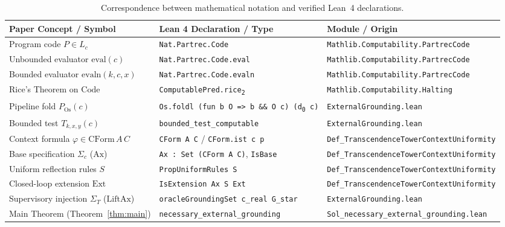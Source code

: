 \documentclass[11pt]{article}
\theoremstyle{plain}
\theoremstyle{definition}
\theoremstyle{remark}
\newcommand{\Code}{\mathrm{Code}}
\newcommand{\eval}{\mathrm{eval}}
\newcommand{\evaln}{\mathrm{evaln}}
\newcommand{\Os}{\mathrm{Os}}
\newcommand{\Ax}{\mathrm{Ax}}
\newcommand{\Ext}{\mathrm{Ext}}
\newcommand{\LiftAx}{\mathrm{LiftAx}}
\newcommand{\CForm}{\mathrm{CForm}}
\begin{document}
\begin{table}[htbp]
\centering
\footnotesize
\renewcommand{\arraystretch}{1.25}
\begin{tabular}{@{}p{}p{}p{}@{}}
\toprule
\textbf{Paper Concept / Symbol} & \textbf{Lean 4 Declaration / Type} & \textbf{Module / Origin} \\
\midrule
Program code $P \in L_c$ & \texttt{Nat.Partrec.Code} & \texttt{Mathlib.Computability.\allowbreak PartrecCode} \\
Unbounded evaluator $\eval(c)$ & \texttt{Nat.Partrec.Code.eval} & \texttt{Mathlib.Computability.\allowbreak PartrecCode} \\
Bounded evaluator $\evaln(k,c,x)$ & \texttt{Nat.Partrec.Code.evaln} & \texttt{Mathlib.Computability.\allowbreak PartrecCode} \\
Rice's Theorem on $\Code$ & \texttt{ComputablePred.rice\textsubscript{2}} & \texttt{Mathlib.Computability.\allowbreak Halting} \\
Pipeline fold $P_{\Os}(c)$ & \texttt{Os.foldl (fun b O => b \&\& O c) (d\textsubscript{0} c)} & \texttt{ExternalGrounding.lean} \\
Bounded test $T_{k,x,y}(c)$ & \texttt{bounded\_test\_computable} & \texttt{ExternalGrounding.lean} \\
Context formula $\varphi \in \CForm\,A\,C$ & \texttt{CForm A C} / \texttt{CForm.ist c p} & \texttt{Def\_TranscendenceTower\allowbreak ContextUniformity} \\
Base specification $\Sigma_c$ ($\Ax$) & \texttt{Ax : Set (CForm A C)}, \texttt{IsBase} & \texttt{Def\_TranscendenceTower\allowbreak ContextUniformity} \\
Uniform reflection rules $S$ & \texttt{PropUniformRules S} & \texttt{Def\_TranscendenceTower\allowbreak ContextUniformity} \\
Closed-loop extension $\Ext$ & \texttt{IsExtension Ax S Ext} & \texttt{Def\_TranscendenceTower\allowbreak ContextUniformity} \\
Supervisory injection $\Sigma_T$ ($\LiftAx$) & \texttt{oracleGroundingSet c\_real G\_star} & \texttt{ExternalGrounding.lean} \\
Main Theorem (Theorem~\ref{thm:main}) & \texttt{necessary\_external\_grounding} & \texttt{Sol\_necessary\_external\_\allowbreak grounding.lean} \\
\bottomrule
\end{tabular}
\caption{Correspondence between mathematical notation and verified Lean~4 declarations.}
\label{tab:lean}
\end{table}
\end{document}
